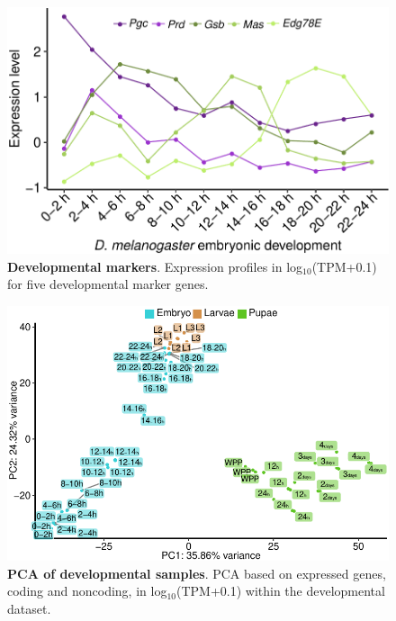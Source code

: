 \begin{figure}[ht!]
  \centering
  \includegraphics[scale=0.65]{plots/appendix/dme/markers.pdf}
  \caption[Developmental markers]{\textbf{Developmental markers}. Expression profiles in log$_{10}$(TPM+0.1) for five developmental marker genes.}
  \label{supp-fig:markers-dev}
\end{figure}

\begin{figure}[ht!]
  \centering
  \includegraphics[scale=0.7]{plots/appendix/dme/modencode.pca.pdf}
  \caption[PCA of developmental samples]{\textbf{PCA of developmental samples}. PCA based on expressed genes, coding and noncoding, in log$_{10}$(TPM+0.1) within the developmental dataset.}
  \label{supp-fig:pca-modencode}
\end{figure}

